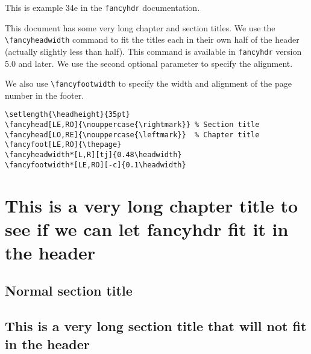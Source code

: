 \documentclass[oneside]{book}
\begin{document}
\thispagestyle{plain}
\tableofcontents

\bigskip

\noindent
\begin{boxedminipage}{\textwidth}
This is example 34e in the \texttt{fancyhdr} documentation.

This document has some very long chapter and section titles. We use the \verb|\fancyheadwidth| command to fit the titles each in their own half of the header (actually slightly less than half). This command is available in \texttt{fancyhdr} version 5.0 and later. We use the second optional parameter to specify the alignment.

We also use \verb|\fancyfootwidth| to specify the width and alignment of the page number in the footer.

\begin{verbatim}
\setlength{\headheight}{35pt}
\fancyhead[LE,RO]{\nouppercase{\rightmark}} % Section title
\fancyhead[LO,RE]{\nouppercase{\leftmark}}  % Chapter title
\fancyfoot[LE,RO]{\thepage}
\fancyheadwidth*[L,R][tj]{0.48\headwidth}
\fancyfootwidth*[LE,RO][-c]{0.1\headwidth}
\end{verbatim}
\end{boxedminipage}

\newpage
\pagestyle{fancy}
\chapter{This is a very long chapter title to see if we can
          let fancyhdr fit it in the header}
\thispagestyle{fancy}

\kant[2-4]

\section{Normal section title}

\kant[5-6]

\section{This is a very long section title that will not fit
         in the header}

\kant[7]
\end{document}
